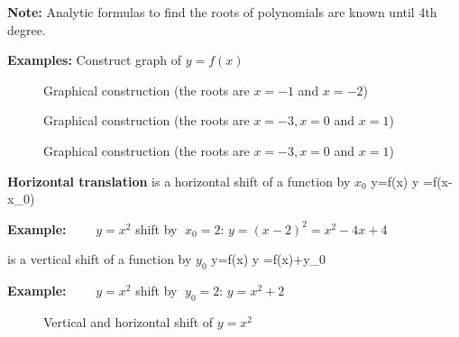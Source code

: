 {\bf Note:} Analytic formulas to find the roots of polynomials are known until 4th degree.

{\bf Examples:} Construct graph of $y=f(x)$ \vs
\begin{figure}[!h]
\centering {}
\hspace*{0.5cm}
 \svs 
\caption{Graphical construction (the roots are $x=-1$ and $x=-2$)} \label{fig8}
\end{figure}

\vs\vs\begin{figure}[!h]
\centering {}
\hspace*{0.5cm}%
 \svs 
\caption{Graphical construction (the roots are $x=-3, x=0$ and $x=1$)} \label{fig9}
\end{figure}

\begin{figure}[!h]
\centering {}
\hspace*{0.5cm}%
 \svs 
\caption{Graphical construction (the roots are $x=-3, x=0$ and $x=1$)} \label{fig9}
\end{figure} 

\newpage

{\bf Horizontal translation} is a horizontal shift of a function by $x_0$
\bnn y=f(x) \; \rightarrow \; y =f(x-x_0) \enn

{\bf Example:} $\qquad y = x^2$  \; shift by $\; x_0=2$: \; $ y = (x-2)^2 = x^2 - 4x +4$  \vs

 is a vertical shift of a function by $y_0$
\bnn y=f(x) \; \rightarrow \; y =f(x)+y_0 \enn

{\bf Example:} $\qquad y=x^2$ \; shift by $\; y_0=2$: \;  $ y=x^2+2 $ \vs

\vs\begin{figure}[!h]
\centering {} 
\hspace*{0.5cm}
 \svs 
\caption{Vertical and horizontal shift of $y=x^2$} \label{fig11}
\end{figure}

